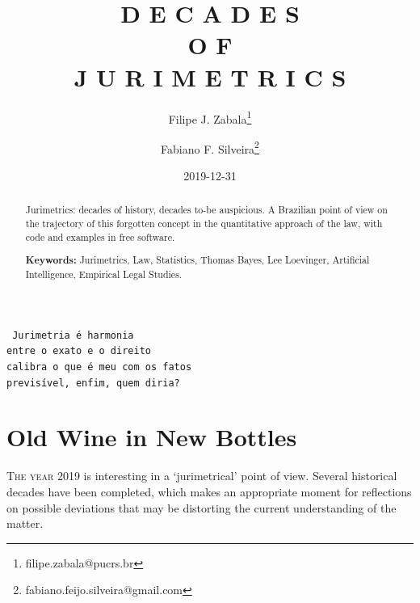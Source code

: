 \documentclass[a4paper]{exam}
\theoremstyle{plain}
\begin{document}
\title{\huge{D E C A D E S} \\ \medskip
       \footnotesize{O F} \\
       \huge{J U R I M E T R I C S}}
\author[1]{Filipe J. Zabala\thanks{filipe.zabala@pucrs.br}}
\author[2]{Fabiano F. Silveira\thanks{fabiano.feijo.silveira@gmail.com}}  

\renewcommand\Authands{ and }
  \date{2019-12-31 \\
    \begingroup
    \fontsize{9pt}{11pt}\selectfont
    \endgroup}
  \maketitle

\begin{flushright}
\texttt{
  Jurimetria é harmonia \\ 
  entre o exato e o direito \\ 
  calibra o que é meu com os fatos \\ 
  previsível, enfim, quem diria?
}
\end{flushright}

\tableofcontents

\newpage
\begin{abstract}

  Jurimetrics: decades of history, decades to-be auspicious. A Brazilian point of view on the trajectory of this forgotten concept in the quantitative approach of the law, with code and examples in free software.
  

\noindent \textbf{Keywords:} Jurimetrics, Law, Statistics, Thomas Bayes, Lee Loevinger, Artificial Intelligence, Empirical Legal Studies.
\end{abstract}

\section{Old Wine in New Bottles}
\lettrine[lines=2, slope=0.6em]{T}{he year} 2019 is interesting in a `jurimetrical' point of view. Several historical decades have been completed, which makes an appropriate moment for reflections on possible deviations that may be distorting the current understanding of the matter. 
\end{document}
